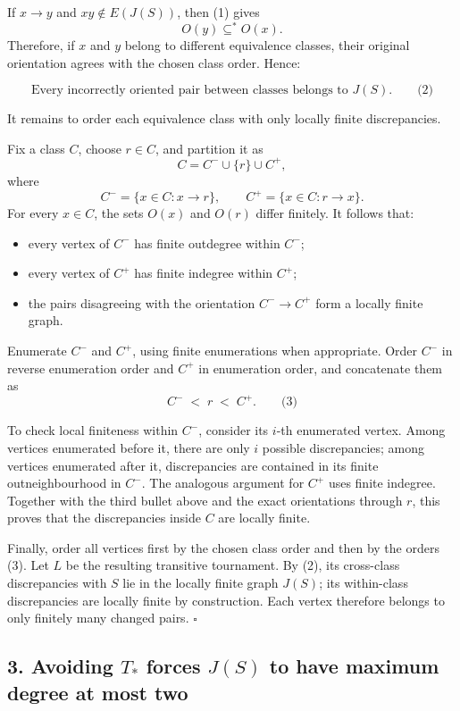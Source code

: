 \documentclass[
  11pt,
  a4paper,
]{article}
\providecommand{\tightlist}{%
  \setlength{\itemsep}{0pt}\setlength{\parskip}{0pt}}
\begin{document}
If \(x\to y\) and \(xy\notin E(J(S))\), then (1) gives \[
O(y)\subseteq^\ast O(x).
\] Therefore, if \(x\) and \(y\) belong to different equivalence
classes, their original orientation agrees with the chosen class order.
Hence:

\[
\text{Every incorrectly oriented pair between classes belongs to }J(S).
\qquad\text{(2)}
\]

It remains to order each equivalence class with only locally finite
discrepancies.

Fix a class \(C\), choose \(r\in C\), and partition it as \[
C=C^-\cup\{r\}\cup C^+,
\] where \[
C^-=\{x\in C:x\to r\},
\qquad
C^+=\{x\in C:r\to x\}.
\] For every \(x\in C\), the sets \(O(x)\) and \(O(r)\) differ finitely.
It follows that:

\begin{itemize}
\tightlist
\item
  every vertex of \(C^-\) has finite outdegree within \(C^-\);
\item
  every vertex of \(C^+\) has finite indegree within \(C^+\);
\item
  the pairs disagreeing with the orientation \(C^-\to C^+\) form a
  locally finite graph.
\end{itemize}

Enumerate \(C^-\) and \(C^+\), using finite enumerations when
appropriate. Order \(C^-\) in reverse enumeration order and \(C^+\) in
enumeration order, and concatenate them as \[
C^- \;<\; r \;<\; C^+.
\qquad\text{(3)}
\]

To check local finiteness within \(C^-\), consider its \(i\)-th
enumerated vertex. Among vertices enumerated before it, there are only
\(i\) possible discrepancies; among vertices enumerated after it,
discrepancies are contained in its finite outneighbourhood in \(C^-\).
The analogous argument for \(C^+\) uses finite indegree. Together with
the third bullet above and the exact orientations through \(r\), this
proves that the discrepancies inside \(C\) are locally finite.

Finally, order all vertices first by the chosen class order and then by
the orders (3). Let \(L\) be the resulting transitive tournament. By
(2), its cross-class discrepancies with \(S\) lie in the locally finite
graph \(J(S)\); its within-class discrepancies are locally finite by
construction. Each vertex therefore belongs to only finitely many
changed pairs. \(\square\)

\subsection{\texorpdfstring{3. Avoiding \(T_\ast\) forces \(J(S)\) to
have maximum degree at most
two}{3. Avoiding T\_\textbackslash ast forces J(S) to have maximum degree at most two}}\label{avoiding-t_ast-forces-js-to-have-maximum-degree-at-most-two}
\end{document}
